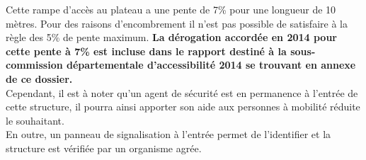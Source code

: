 \documentclass[hidelinks, paper=a4, fontsize=13pt]{report}
\begin{document}
Cette rampe d’accès au plateau a une pente de 7\% pour une longueur de 10 mètres. Pour des raisons d’encombrement il n’est pas possible de satisfaire à la règle des 5\% de pente maximum. \textbf{La dérogation accordée en 2014 pour cette pente à 7\% est incluse dans le rapport destiné à la sous-commission départementale d’accessibilité 2014 se trouvant en annexe de ce dossier.}\\

Cependant, il est à noter qu’un agent de sécurité est en permanence à l’entrée de cette structure, il pourra ainsi apporter son aide aux personnes à mobilité réduite le souhaitant.\\

En outre, un panneau de signalisation à l’entrée permet de l’identifier et la structure est vérifiée par un organisme agrée.
\end{document}
